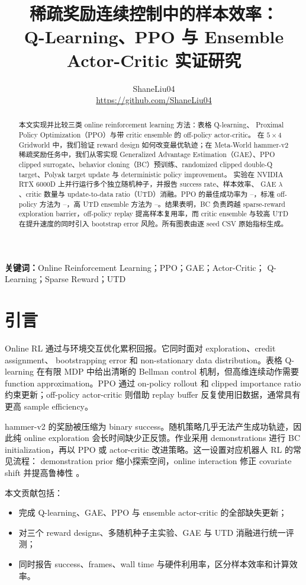 \documentclass[10pt,twocolumn,a4paper]{ctexart}
\title{\vspace{-1.2em}\textbf{稀疏奖励连续控制中的样本效率：\\
Q-Learning、PPO 与 Ensemble Actor-Critic 实证研究}}
\author{ShaneLiu04\\
\small\url{https://github.com/ShaneLiu04}}
\date{}
\providecommand{\PPOBest}{--}
\providecommand{\OffBaseBest}{--}
\providecommand{\OffUTDBest}{--}
\begin{document}
\maketitle
\thispagestyle{fancy}

\begin{abstract}
本文实现并比较三类 online reinforcement learning 方法：表格 Q-learning、
Proximal Policy Optimization（PPO）与带 critic ensemble 的 off-policy actor-critic。
在 $5\times4$ Gridworld 中，我们验证 reward design 如何改变最优轨迹；在
Meta-World hammer-v2 稀疏奖励任务中，我们从零实现 Generalized Advantage
Estimation（GAE）、PPO clipped surrogate、behavior cloning（BC）预训练、randomized
clipped double-Q target、Polyak target update 与 deterministic policy improvement。
实验在 NVIDIA RTX 6000D 上并行运行多个独立随机种子，并报告 success rate、样本效率、
GAE $\lambda$、critic 数量与 update-to-data ratio（UTD）消融。PPO 的最佳成功率为
\PPOBest，标准 off-policy 方法为 \OffBaseBest，高 UTD ensemble 方法为
\OffUTDBest。结果表明，BC 负责跨越 sparse-reward exploration barrier，off-policy
replay 提高样本复用率，而 critic ensemble 与较高 UTD 在提升速度的同时引入
bootstrap error 风险。所有图表由逐 seed CSV 原始指标生成。
\end{abstract}

\textbf{关键词：}Online Reinforcement Learning；PPO；GAE；Actor-Critic；
Q-Learning；Sparse Reward；UTD

\section{引言}
Online RL 通过与环境交互优化累积回报。它同时面对 exploration、credit assignment、
bootstrapping error 和 non-stationary data distribution。表格 Q-learning 在有限 MDP
中给出清晰的 Bellman control 机制\citep{watkins1992qlearning}，但高维连续动作需要
function approximation。PPO 通过 on-policy rollout 和 clipped importance ratio
约束更新\citep{schulman2017ppo}；off-policy actor-critic 则借助 replay buffer
反复使用旧数据，通常具有更高 sample efficiency。

hammer-v2 的奖励被压缩为 binary success。随机策略几乎无法产生成功轨迹，因此纯 online
exploration 会长时间缺少正反馈。作业采用 demonstrations 进行 BC initialization，再以
PPO 或 actor-critic 改进策略。这一设置对应机器人 RL 的常见流程：
demonstration prior 缩小探索空间，online interaction 修正 covariate shift 并提高鲁棒性
\citep{vecerik2017ddpgfd,nair2018demo}。

本文贡献包括：
\begin{itemize}
  \item 完成 Q-learning、GAE、PPO 与 ensemble actor-critic 的全部缺失更新；
  \item 对三个 reward designs、多随机种子主实验、GAE 与 UTD 消融进行统一评测；
  \item 同时报告 success、frames、wall time 与硬件利用率，区分样本效率和计算效率。
\end{itemize}
\end{document}
